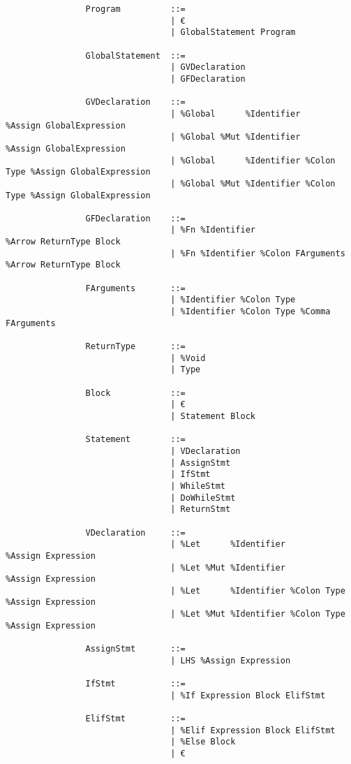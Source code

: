 \documentclass{article}
\begin{document}
			\begin{verbatim}
				Program          ::=
				                 | €
				                 | GlobalStatement Program
				                 
				GlobalStatement  ::=
				                 | GVDeclaration
				                 | GFDeclaration
				                 
				GVDeclaration    ::=
				                 | %Global      %Identifier             %Assign GlobalExpression
				                 | %Global %Mut %Identifier             %Assign GlobalExpression
				                 | %Global      %Identifier %Colon Type %Assign GlobalExpression
				                 | %Global %Mut %Identifier %Colon Type %Assign GlobalExpression
				                 
				GFDeclaration    ::=
				                 | %Fn %Identifier                   %Arrow ReturnType Block
				                 | %Fn %Identifier %Colon FArguments %Arrow ReturnType Block
				                 
				FArguments       ::=
				                 | %Identifier %Colon Type
				                 | %Identifier %Colon Type %Comma FArguments
				
				ReturnType       ::=
				                 | %Void
				                 | Type
				                 
				Block            ::=
				                 | €
				                 | Statement Block
				
				Statement        ::=
				                 | VDeclaration
				                 | AssignStmt
				                 | IfStmt
				                 | WhileStmt
				                 | DoWhileStmt
				                 | ReturnStmt
				                 
				VDeclaration     ::=
				                 | %Let      %Identifier             %Assign Expression
				                 | %Let %Mut %Identifier             %Assign Expression
				                 | %Let      %Identifier %Colon Type %Assign Expression
				                 | %Let %Mut %Identifier %Colon Type %Assign Expression
				                 
				AssignStmt       ::=
				                 | LHS %Assign Expression
				                 
				IfStmt           ::=
				                 | %If Expression Block ElifStmt
				                 
				ElifStmt         ::=
				                 | %Elif Expression Block ElifStmt
				                 | %Else Block
				                 | €
				                 

\end{verbatim}
\end{document}
